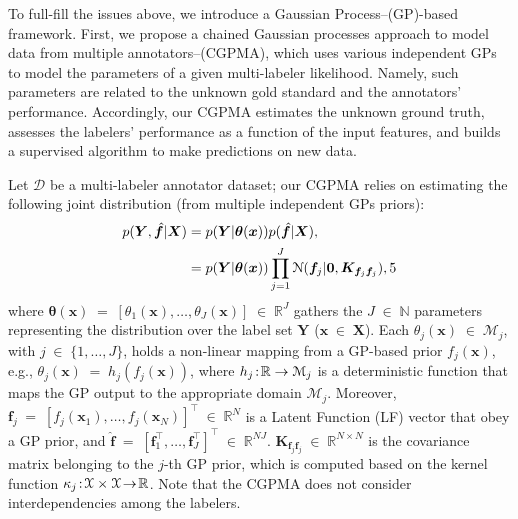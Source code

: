 \documentclass[journal]{IEEEtran}
\providecommand{\ve}[1]{{\bm{#1}}}%
\providecommand{\mat}[1]{{\bm{#1}}} %
\newcommand{\Real}{\mathbb{R}}
\DeclareMathOperator{\en}{\!\,\in\!\,}
\DeclareMathOperator{\igual}{\!\,=\!\,}
\providecommand{\s}[1]{\negthinspace#1\negthinspace}%
\providecommand{\ve}[1]{{\mathbf{#1}}}
\providecommand{\mat}[1]{{\mathbf{#1}}}
\newcommand{\boldx}{\mathbf{x}}
\newcommand{\gauss}{\mathcal{N}} %
\begin{document}
To full-fill the issues above, we introduce a Gaussian Process--(GP)-based framework. First, we propose a chained Gaussian processes approach to model data from multiple annotators--(CGPMA), which uses various independent GPs to model the parameters of a given multi-labeler likelihood. Namely, such parameters are related to the unknown gold standard and the annotators' performance. Accordingly, our CGPMA estimates the unknown ground truth, assesses the labelers' performance as a function of the input features, and builds a supervised algorithm to make predictions on new data. 

Let $\mathcal{D}$ be a multi-labeler annotator dataset; our CGPMA relies on estimating the following joint distribution (from multiple independent GPs priors):
\begin{align}
\notag p(\mat{Y},\hat{\ve{f}}|\mat{X}) &= p(\mat{Y}|\bm{\theta}(\ve{x}))p(\hat{\ve{f}}|\mat{X}),\\
&= p(\mat{Y}|\bm{\theta}(\ve{x}))\prod_{j=1}^{J}\gauss(\ve{f}_j|\ve{0}, \mat{K}_{\ve{f}_j\ve{f}_j}),
5\label{eq:Likelihood}
\end{align}
where $\bm{\theta}(\ve{x})\igual\left[{\theta}_1(\ve{x}), \dots , {\theta}_J(\ve{x})\right]\en\Real^{J}$ gathers the $J\en\mathbb{N}$ parameters representing the distribution over the label set $\mat{Y}$ ($\ve{x}\en\mat{X}$). Each $\theta_j(\ve{x}) \en \mathcal{M}_j$, with $j\en \{1, \dots , J\}$, holds a non-linear mapping from a GP-based prior $f_j (\ve{x})$, e.g., $\theta_j(\ve{x})\igual h_j(f_j(\boldx))$,
where $h_j\s{:}\Real\to \mathcal{M}_j$ is a deterministic function that maps the GP output to the appropriate domain $\mathcal{M}_j$. Moreover, $\ve{f}_j\igual\left[f_j(\ve{x}_1), \dots , f_j(\ve{x}_N)\right]^{\top}\en \Real^{N}$ is a Latent Function (LF) vector that obey a GP prior, and $\hat{\ve{f}} \igual \left[\ve{f}_1^{\top}, \dots , \ve{f}_J^{\top}\right]^{\top}\en \Real^{NJ}$. $\mat{K}_{\ve{f}_j\ve{f}_j} \en\Real^{N\times N}$ is the covariance matrix belonging to the $j$-th GP prior, which is computed based on the kernel function  $\kappa_j\s{:}\mathcal{X}\times\mathcal{X}\s{\to}\Real$. Note that the CGPMA does not consider interdependencies among the labelers. 
\end{document}
